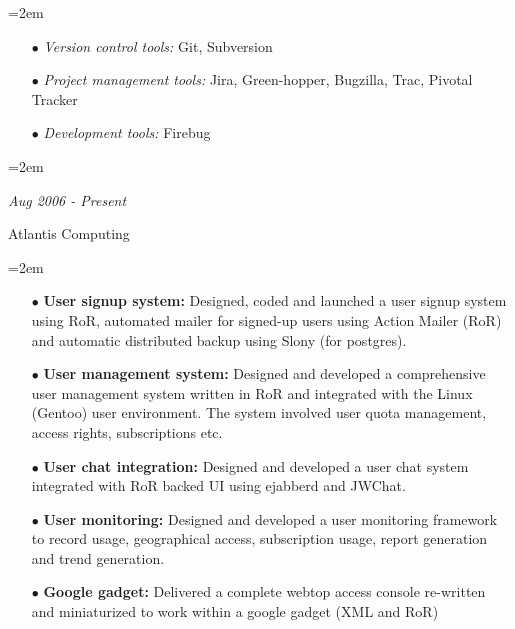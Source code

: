 \documentclass{scrartcl}
\newcommand{\MarginDate}[1]{\marginpar{\raggedleft\itshape\small#1}}
\newlength{\datebox}\settowidth{\datebox}{August 2006 - Present}
\newcommand{\NewWorkExperience}[3]{\noindent\hangindent=2em\hangafter=0 \parbox{\datebox}{\textit{#1}}\hspace{1.5em}
  #2 #3%
\vspace{0.5em}}
\newcommand{\Description}[1]{\hangindent=2em\hangafter=0\noindent\raggedright\footnotesize{#1}\par\normalsize}
\begin{document}
\begin{cv}{
\href{http://www.develmj.com}{}
}
\vspace{0.5em}

\Description{
\begin{itemize}
  \item[\footnotesize$\bullet$] \textsl{Version control tools:} Git, Subversion\MarginDate{Tools}
  \item[\footnotesize$\bullet$] \textsl{Project management tools:} Jira, Green-hopper, Bugzilla, Trac,
    Pivotal Tracker
  \item[\footnotesize$\bullet$] \textsl{Development tools:} Firebug
\end{itemize}
}

\vspace{1.5em}

\noindent{}
\vspace{0.5em}

\NewWorkExperience{\small{Aug 2006 - Present}}{\small{Atlantis
    Computing}}{}

\Description{
\begin{itemize}
  \item[\footnotesize$\bullet$] \textbf{User signup system: }Designed,
    coded and launched \MarginDate{Atlantis Webtop}
    a user signup system using RoR, automated mailer for
    signed-up users using Action Mailer (RoR) and automatic distributed backup using Slony (for postgres).
  \item[\footnotesize$\bullet$] \textbf{User management system: }Designed and developed a
    comprehensive user management system written in RoR and integrated
    with the Linux (Gentoo) user environment. The system involved user
    quota management, access rights, subscriptions etc.
  \item[\footnotesize$\bullet$] \textbf{User chat integration: } Designed and developed a user chat system integrated with RoR backed UI using ejabberd and JWChat.
  \item[\footnotesize$\bullet$] \textbf{User monitoring: }Designed and developed a user
    monitoring framework to record usage, geographical access,
    subscription usage, report generation and trend generation.
  \item[\footnotesize$\bullet$] \textbf{Google gadget: }Delivered a complete
    webtop access console re-written and miniaturized to work within a
    google gadget (XML and RoR)
\end{itemize}
}

\vspace{0.5em}


\end{cv}
\end{document}
